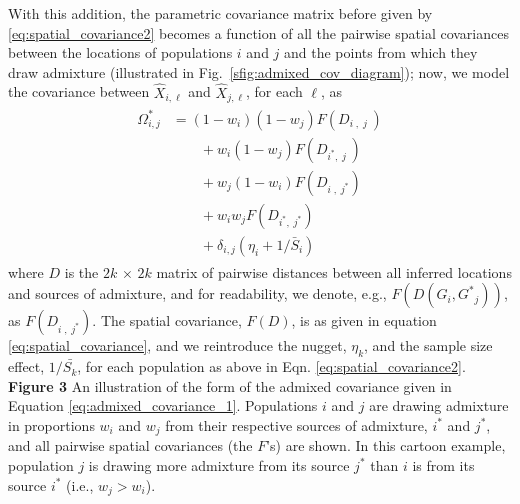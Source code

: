 \documentclass[10pt,letterpaper]{article}
\newcommand{\identifyadmixsource}[1]{{#1^{*}}}
\providecommand{\DIFaddbegin}{} %
\providecommand{\DIFaddend}{} %
\providecommand{\DIFdelbegin}{} %
\providecommand{\DIFdelend}{} %
\begin{document}
With this addition, the parametric covariance matrix before given by \eqref{eq:spatial_covariance2}
becomes a function of all the pairwise spatial covariances between the locations of populations $i$ and $j$ and the points from which they draw admixture 
(illustrated in Fig.\ \ref{sfig:admixed_cov_diagram});
now, we model the covariance between $\hat X_{i,\ell}$ and $\hat X_{j,\ell}$, for each $\ell$, as
\begin{align}
\label{eq:admixed_covariance_1}\DIFdelbegin %
\DIFdelend \DIFaddbegin \begin{split}
\identifyadmixsource{\Omega_{i,j}} 
    &= 
  (1-w_i)(1-w_j) F(D_{i\;,\;j\;}) \\
  &\qquad {} + w_i(1-w_j) F(D_{\identifyadmixsource{i},\;j\;})    \\
  &\qquad {} + w_j(1-w_i) F(D_{i\;,\;\identifyadmixsource{j}})    \\
  &\qquad {} + w_i w_j F(D_{\identifyadmixsource{i},\;\identifyadmixsource{j}})    \\
  &\qquad {} + \delta_{i,j} (\eta_i + 1 / \bar{S}_i) 
\end{split}
\DIFaddend \end{align}
where $D$ is the $2k \, \times \, 2k$ matrix of pairwise distances between all inferred locations and sources of admixture, 
and for readability, we denote, e.g., $F(D(G_i,\identifyadmixsource{G}_j))$, as $F(D_{i\;,\;\identifyadmixsource{j}})$.
The spatial covariance, $F(D)$, is as given in equation \eqref{eq:spatial_covariance}, and we reintroduce the nugget, $\eta_k$, and the sample size effect, $1/\bar{S_k}$, for each population as above in Eqn. \eqref{eq:spatial_covariance2}.
%
\newline\newline
{\bf{Figure 3}} An illustration of the form of the admixed covariance given in Equation \eqref{eq:admixed_covariance_1}.  Populations $i$ and $j$ are drawing admixture in proportions $w_i$ and $w_j$ from their respective sources of admixture, $\identifyadmixsource{i}$ and $\identifyadmixsource{j}$, and all pairwise spatial covariances (the $F$'s) are shown.  In this cartoon example, population $j$ is drawing more admixture from its source $\identifyadmixsource{j}$ than $i$ is from its source $\identifyadmixsource{i}$ (i.e., $w_j > w_i$).
\newline\newline
\end{document}
